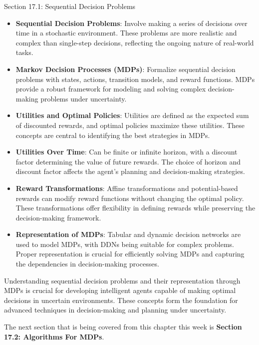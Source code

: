 \begin{notes}{Section 17.1: Sequential Decision Problems}
\begin{highlight}
        \begin{itemize}
            \item \textbf{Sequential Decision Problems}: Involve making a series of decisions over time in a stochastic environment. These problems are more realistic and complex than single-step decisions, 
            reflecting the ongoing nature of real-world tasks.
            \item \textbf{Markov Decision Processes (MDPs)}: Formalize sequential decision problems with states, actions, transition models, and reward functions. MDPs provide a robust framework for modeling 
            and solving complex decision-making problems under uncertainty.
            \item \textbf{Utilities and Optimal Policies}: Utilities are defined as the expected sum of discounted rewards, and optimal policies maximize these utilities. These concepts are central to 
            identifying the best strategies in MDPs.
            \item \textbf{Utilities Over Time}: Can be finite or infinite horizon, with a discount factor determining the value of future rewards. The choice of horizon and discount factor affects the agent's 
            planning and decision-making strategies.
            \item \textbf{Reward Transformations}: Affine transformations and potential-based rewards can modify reward functions without changing the optimal policy. These transformations offer flexibility 
            in defining rewards while preserving the decision-making framework.
            \item \textbf{Representation of MDPs}: Tabular and dynamic decision networks are used to model MDPs, with DDNs being suitable for complex problems. Proper representation is crucial for efficiently 
            solving MDPs and capturing the dependencies in decision-making processes.
        \end{itemize}
        Understanding sequential decision problems and their representation through MDPs is crucial for developing intelligent agents capable of making optimal decisions in uncertain environments. These 
        concepts form the foundation for advanced techniques in decision-making and planning under uncertainty.

    \end{highlight}
\end{notes}

The next section that is being covered from this chapter this week is \textbf{Section 17.2: Algorithms For MDPs}.

